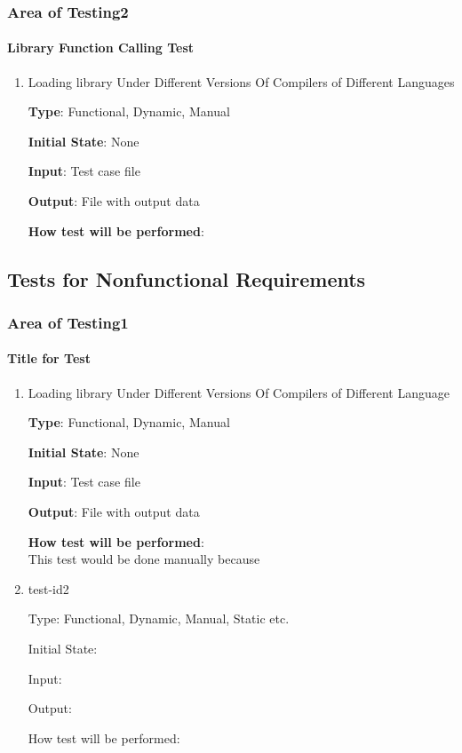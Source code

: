 \documentclass[12pt, titlepage]{article}
\begin{document}
\subsubsection{Area of Testing2}
\paragraph{Library Function Calling Test}

\begin{enumerate}
\item{Loading library Under Different Versions Of Compilers of Different Languages\\}

\textbf {Type}: Functional, Dynamic, Manual
					
\textbf {Initial State}: None
					
\textbf {Input}: Test case file
					
\textbf {Output}:  File with output data
					
\textbf {How test will be performed}: \\

\end{enumerate} 
\subsection{Tests for Nonfunctional Requirements}

\subsubsection{Area of Testing1}
		
\paragraph{Title for Test}

\begin{enumerate}

\item{Loading library Under Different Versions Of Compilers of Different Language\\}

\textbf {Type}: Functional, Dynamic, Manual
					
\textbf {Initial State}: None
					
\textbf {Input}: Test case file
					
\textbf {Output}:  File with output data
					
\textbf {How test will be performed}: \\
This test would be done manually because 

					
\item{test-id2\\}

Type: Functional, Dynamic, Manual, Static etc.
					
Initial State: 
					
Input: 
					
Output: 
					
How test will be performed: 

\end{enumerate}
\end{document}
